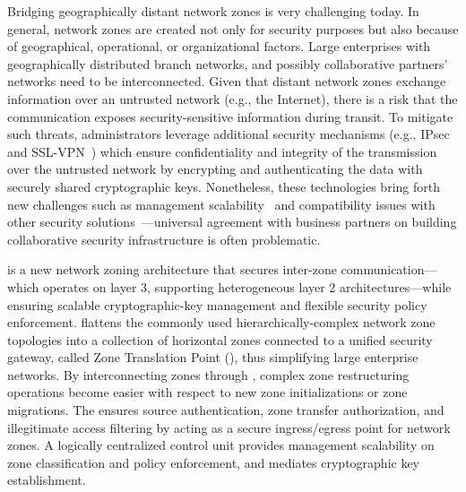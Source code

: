 Bridging geographically distant network zones is very challenging today. In
general, network zones are created not only for security purposes but also
because of geographical, operational, or organizational factors. Large
enterprises with geographically distributed branch networks, and possibly
collaborative partners' networks need to be interconnected. Given that distant
network zones exchange information over an untrusted network (e.g., the
Internet), there is a risk that the communication exposes security-sensitive
information during transit. To mitigate such threats, administrators leverage
additional security mechanisms (e.g., IPsec~\cite{rfc4301} and
SSL-VPN~\cite{sun2011advantages}) which ensure confidentiality and integrity of
the transmission over the untrusted network by encrypting and authenticating the
data with securely shared cryptographic keys. Nonetheless, these technologies
bring forth new challenges such as management
scalability~\cite{felsch2018dangers} and compatibility issues with other
security solutions~\cite{liu2008collaborative}---universal agreement with
business partners on building collaborative security infrastructure is often
problematic.


\name is a new network zoning architecture that secures inter-zone
communication---which operates on layer 3, supporting heterogeneous layer 2
architectures---while ensuring scalable cryptographic-key management and
flexible security policy enforcement. \name flattens the commonly used
hierarchically-complex network zone topologies into a collection of horizontal
zones connected to a unified security gateway, called Zone Translation Point
(\tp), thus simplifying large enterprise networks. By interconnecting zones
through \tps, complex zone restructuring operations become easier with respect
to new zone initializations or zone migrations. The \tp ensures source
authentication, zone transfer authorization, and illegitimate access filtering
by acting as a secure ingress/egress point for network zones. A logically
centralized control unit provides management scalability on zone classification
and policy enforcement, and mediates cryptographic key establishment.

